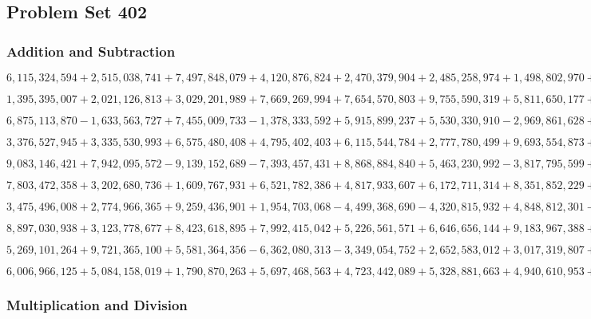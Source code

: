 \hypertarget{problem-set-402}{%
\subsection{Problem Set 402}\label{problem-set-402}}

\hypertarget{addition-and-subtraction}{%
\subsubsection{Addition and
Subtraction}\label{addition-and-subtraction}}

\(6,115,324,594+2,515,038,741+7,497,848,079+4,120,876,824+2,470,379,904+2,485,258,974+1,498,802,970+2,648,694,216+6,303,700,020+2,315,991,761\)

\(1,395,395,007+2,021,126,813+3,029,201,989+7,669,269,994+7,654,570,803+9,755,590,319+5,811,650,177+9,995,012,590+5,648,046,401+4,722,374,629\)

\(6,875,113,870-1,633,563,727+7,455,009,733-1,378,333,592+5,915,899,237+5,530,330,910-2,969,861,628+1,159,426,765+5,398,541,871-6,346,581,929\)

\(3,376,527,945+3,335,530,993+6,575,480,408+4,795,402,403+6,115,544,784+2,777,780,499+9,693,554,873+5,999,453,061+7,391,197,248+8,654,140,779\)

\(9,083,146,421+7,942,095,572-9,139,152,689-7,393,457,431+8,868,884,840+5,463,230,992-3,817,795,599+2,412,032,139+4,568,405,595-5,844,681,838\)

\(7,803,472,358+3,202,680,736+1,609,767,931+6,521,782,386+4,817,933,607+6,172,711,314+8,351,852,229+2,908,961,173+6,573,219,238+3,662,844,605\)

\(3,475,496,008+2,774,966,365+9,259,436,901+1,954,703,068-4,499,368,690-4,320,815,932+4,848,812,301-4,179,020,222+1,064,755,589-7,482,438,061\)

\(8,897,030,938+3,123,778,677+8,423,618,895+7,992,415,042+5,226,561,571+6,646,656,144+9,183,967,388+6,573,832,023+4,858,893,045+3,293,818,862\)

\(5,269,101,264+9,721,365,100+5,581,364,356-6,362,080,313-3,349,054,752+2,652,583,012+3,017,319,807+6,057,762,726-5,849,346,343-9,597,297,898\)

\(6,006,966,125+5,084,158,019+1,790,870,263+5,697,468,563+4,723,442,089+5,328,881,663+4,940,610,953+2,793,476,624+6,688,773,995+9,287,957,810\)

\hypertarget{multiplication-and-division}{%
\subsubsection{Multiplication and
Division}\label{multiplication-and-division}}

